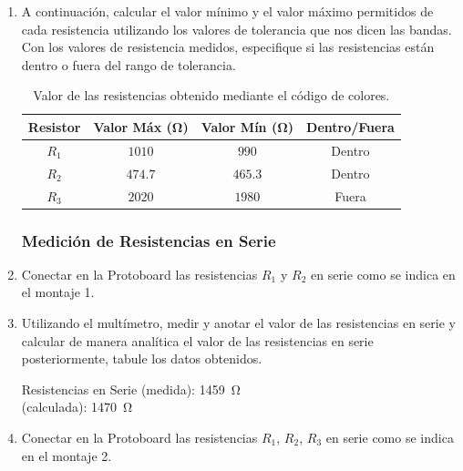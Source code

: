 \documentclass{article}
\begin{document}
\begin{enumerate}
        \item A continuación, calcular el valor mínimo y el valor máximo permitidos de cada resistencia utilizando los valores de tolerancia que nos dicen las bandas. Con los valores de resistencia medidos, especifique si las resistencias están dentro o fuera del rango de tolerancia.
        
        \begin{table}[ht]
            \centering
            \begin{tabular}{|c|c|c|c|} %
                \midrule
                Resistor & Valor Máx (\unit{\ohm}) & Valor Mín (\unit{\ohm}) & Dentro/Fuera \\
                \midrule
                $R_1$   & $1010$    & $990$    & Dentro \\
                $R_2$   & $474.7$   & $465.3$  & Dentro \\
                $R_3$   & $2020$    & $1980$   & Fuera  \\
                \midrule
            \end{tabular}
            \caption{Valor de las resistencias obtenido mediante el código de colores.}
        \end{table}

        \subsubsection*{Medición de Resistencias en Serie}
        \item Conectar en la Protoboard las resistencias $R_1$ y $R_2$ en serie como se indica en el montaje 1.


        \item Utilizando el multímetro, medir y anotar el valor de las resistencias en serie y calcular de manera analítica el valor de las resistencias en serie posteriormente, tabule los datos obtenidos.
        
        Resistencias en Serie (medida): \SI{1459}{\ohm}\\
        \hspace*{2.85cm} (calculada): \SI{1470}{\ohm}

        \item Conectar en la Protoboard las resistencias $R_1$, $R_2$, $R_3$ en serie como se indica en el montaje 2.
        

\end{enumerate}
\end{document}
